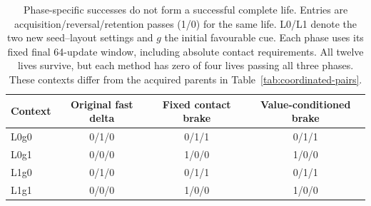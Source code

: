 \begin{table}[htbp]\centering\small
\caption{Phase-specific successes do not form a successful complete life. Entries are acquisition/reversal/retention passes (1/0) for the same life. L0/L1 denote the two new seed--layout settings and $g$ the initial favourable cue. Each phase uses its fixed final 64-update window, including absolute contact requirements. All twelve lives survive, but each method has zero of four lives passing all three phases. These contexts differ from the acquired parents in Table~\ref{tab:coordinated-pairs}.}\label{tab:brake-lives}
\begin{tabular}{lccc}\toprule
Context & Original fast delta & Fixed contact brake & Value-conditioned brake\\\midrule
L0g0 & 0/1/0 & 0/1/1 & 0/1/1 \\
L0g1 & 0/0/0 & 1/0/0 & 1/0/0 \\
L1g0 & 0/1/0 & 0/1/1 & 0/1/1 \\
L1g1 & 0/0/0 & 1/0/0 & 1/0/0 \\
\bottomrule\end{tabular}\end{table}\FloatBarrier
